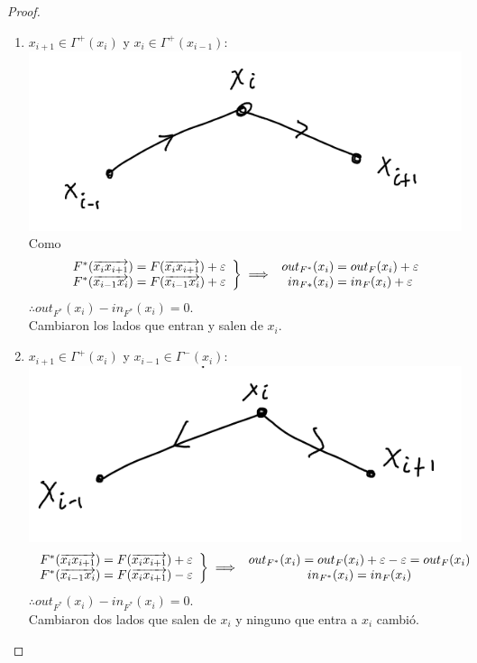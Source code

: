 \begin{proof}
\begin{enumerate}
\item $x_{i+1} \in \Gamma^+(x_i)$ y $x_i\in \Gamma^+(x_{i-1})$:\includegraphics[scale=0.4]{img/forward-forward.png}\\
Como 
\begin{align}
    \left.
    \begin{array}{cc}
    F^*(\overrightarrow{x_i x_{i+1}}) = F(\overrightarrow{x_i x_{i+1}}) + \varepsilon\\
    F^*(\overrightarrow{x_{i-1} x_i}) = F(\overrightarrow{x_{i-1} x_i}) + \varepsilon 
    \end{array}
     \right\} \implies
     \begin{array}{cc}
    out_{F^*}(x_i) = out_F(x_i) + \varepsilon \\
    in_{F*} (x_i) = in_F(x_i) + \varepsilon
    \end{array}
\end{align}
$\therefore out_{F^*} (x_i) - in_{F^*}(x_i) = 0.$\\
Cambiaron los lados que entran y salen de $x_i$.
    
\item $x_{i+1} \in \Gamma^+(x_i)$ y $x_{i-1} \in \Gamma^{-}(x_{i})$: \includegraphics[scale=0.4]{img/backward-forward.png}\\
\begin{align}
    \left.
    \begin{array}{cc}
    F^*(\overrightarrow{x_i x_{i+1}}) = F(\overrightarrow{x_i x_{i+1}}) + \varepsilon\\
    F^*(\overrightarrow{x_{i-1} x_i}) = F(\overrightarrow{x_i x_{i+1}}) - \varepsilon 
    \end{array}
     \right\} \implies
     \begin{array}{cc}
    out_{F^*}(x_i) = out_F(x_i) + \varepsilon -  \varepsilon = out_F(x_i)\\
    in_{F^*} (x_i) = in_F(x_i)
    \end{array}
\end{align}
$\therefore out_{F^*} (x_i) - in_{F^*}(x_i) = 0.$\\
Cambiaron dos lados que salen de $x_i$ y ninguno que entra a $x_i$ cambió.


\end{enumerate}
\end{proof}
